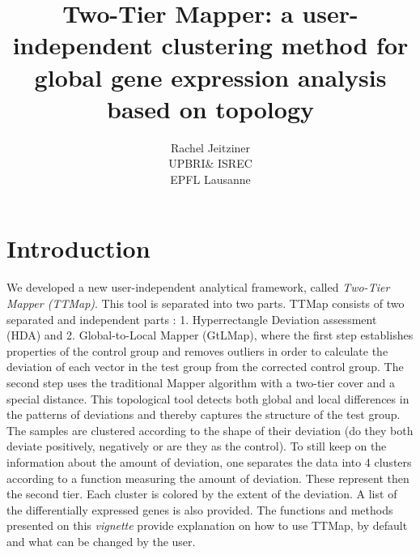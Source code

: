 \documentclass[a4paper,12pt]{article}
\begin{document}
\title{\textbf{\LARGE{Two-Tier Mapper: 
a user-independent clustering 
method 
for global gene expression analysis 
based on topology}}}
\author{Rachel Jeitziner\\
\small{UPBRI\& ISREC} \\
\small{EPFL Lausanne}}
\date{}  %
\maketitle
\tableofcontents
\section{Introduction}
\label{sec:intro}
We developed a new user-independent analytical 
framework, called 
\textit{Two-Tier Mapper (TTMap)}.
This tool is separated into two parts. 
TTMap consists of two separated and 
independent parts : 1. Hyperrectangle 
Deviation assessment
(HDA) and 2. Global-to-Local Mapper (GtLMap), where the first step 
establishes properties of the
control group and removes outliers in order to calculate the 
deviation of each vector in the test group
from the corrected control group. The second step uses the 
traditional Mapper algorithm
\cite{Extracting} with a two-tier cover and a special distance. 
This topological tool detects both global and local differences in the 
patterns of deviations and thereby 
captures the structure of the test group. The samples are clustered 
according to the shape of their 
deviation (do they both deviate positively, negatively or are they as the 
control). To still keep on the 
information about the amount of deviation, one separates the data into 4 
clusters according to a 
function measuring the amount of deviation. These represent then the 
second tier. 
Each cluster is colored by the extent of the deviation. A list of the 
differentially expressed genes is also 
provided.
The functions and methods presented on this \textit{vignette} provide
explanation on how to use TTMap, by default and what can be changed by 
the user. 
\end{document}
